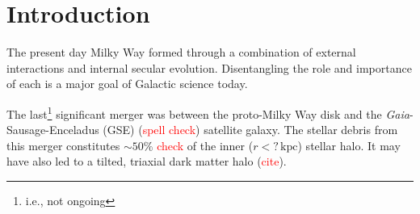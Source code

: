 \documentclass[linenumbers, twocolumn]{aastex631}
\newcommand{\kpc}{\ensuremath{\textrm{kpc}}}
\begin{document}


\section{Introduction} \label{sec:intro}
The present day Milky Way formed through a combination of external interactions
and internal secular evolution. Disentangling the role and importance of each is
a major goal of Galactic science today.

The last\footnote{i.e., not ongoing} significant merger was between the
proto-Milky Way disk and the {\em Gaia}-Sausage-Enceladus (GSE)
(\textcolor{red}{spell check}) satellite galaxy. The stellar debris from this
merger constitutes $\sim50\%$ \textcolor{red}{check} of the inner ($r<?\,\kpc$)
stellar halo. It may have also led to a tilted, triaxial dark matter halo
(\textcolor{red}{cite}).
\end{document}
